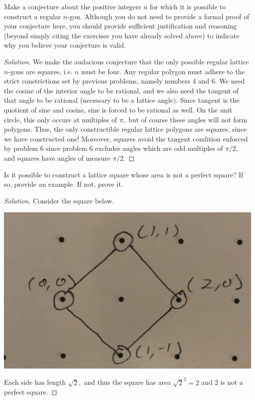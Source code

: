 \documentclass[12pt]{article}
\newenvironment{exercise}[2][Exercise]{\begin{trivlist}
        \item[\hskip \labelsep {\bfseries #1}\hskip \labelsep {\bfseries #2.}]}{\end{trivlist}}
\newenvironment{solution}
        {\begin{proof}[Solution]}
                    {\end{proof}}
\begin{document}
\begin{exercise}{7}
    Make a conjecture about the positive integers \( n \) for which it is possible to construct a regular \( n \)-gon. Although you do not need to provide a formal proof of your conjecture here, you should provide sufficient justification and reasoning (beyond simply citing the exercises you have already solved above) to indicate why you believe your conjecture is valid.
    \begin{solution}
        We make the audacious conjecture that the only possible regular lattice \( n \)-gons are squares, i.e. \( n \) must be four. Any regular polygon must adhere to the strict constrictions set by previous problems, namely numbers 4 and 6. We need the cosine of the interior angle to be rational, and we also need the tangent of that angle to be rational (necessary to be a lattice angle). Since tangent is the quotient of sine and cosine, sine is forced to be rational as well. On the unit circle, this only occurs at multiples of \( \pi, \) but of course these angles will not form polygons. Thus, the only constructible regular lattice polygons are squares, since we have constructed one! Moreover, squares avoid the tangent condition enforced by problem 6 since problem 6 excludes angles which are odd multiples of \( \pi/2 \), and squares have angles of measure \( \pi/2. \)
    \end{solution}
\end{exercise}

\begin{exercise}{8}
    Is it possible to construct a lattice square whose area is not a perfect square? If so, provide an example. If not, prove it.
    \begin{solution}
        Consider the square below.
        \begin{center}
        \includegraphics[width=.5\linewidth]{8}
        \end{center}
        Each side has length \( \sqrt{2} , \) and thus the square has area \( \sqrt{2}^{2} = 2 \) and 2 is not a perfect square.
    \end{solution}
\end{exercise}
\end{document}
